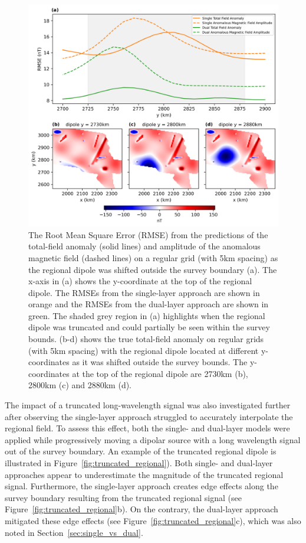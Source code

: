\begin{figure}[tb!]
\centering
\includegraphics[width=1\linewidth]{figures/truncated_regional_rmses.png}
\caption{
    The Root Mean Square Error (RMSE) from the predictions of the total-field anomaly (solid lines) and amplitude of the anomalous magnetic field (dashed lines) on a regular grid (with 5km spacing) as the regional dipole was shifted outside the survey boundary (a). The x-axis in (a) shows the y-coordinate at the top of the regional dipole. The RMSEs from the single-layer approach are shown in orange and the RMSEs from the dual-layer approach are shown in green. The shaded grey region in (a) highlights when the regional dipole was truncated and could partially be seen within the survey bounds. (b-d) shows the true total-field anomaly on regular grids (with 5km spacing) with the regional dipole located at different y-coordinates as it was shifted outside the survey bounds. The y-coordinates at the top of the regional dipole are 2730km (b), 2800km (c) and 2880km (d).
}
\label{fig:truncated_regional_rmses}
\end{figure}

The impact of a truncated long-wavelength signal was also investigated further after observing the single-layer approach struggled to accurately interpolate the regional field. To assess this effect, both the single- and dual-layer models were applied while progressively moving a dipolar source with a long wavelength signal out of the survey boundary. An example of the truncated regional dipole is illustrated in Figure~\ref{fig:truncated_regional}). Both single- and dual-layer approaches appear to underestimate the magnitude of the truncated regional signal. Furthermore, the single-layer approach creates edge effects along the survey boundary resulting from the truncated regional signal (see Figure~\ref{fig:truncated_regional}b). On the contrary, the dual-layer approach mitigated these edge effects (see Figure~\ref{fig:truncated_regional}c), which was also noted in Section~\ref{sec:single_vs_dual}.

